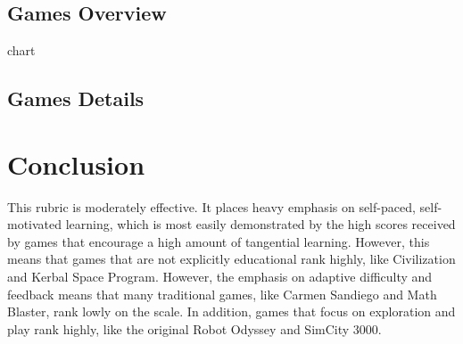 \documentclass[12pt]{report}
\begin{document}
		

	\subsection{Games Overview}
		chart
	\subsection{Games Details}
		

\section{Conclusion}
	This rubric is moderately effective. It places heavy emphasis on self-paced, self-motivated learning, which is most easily demonstrated by the high scores received by games that encourage a high amount of tangential learning. However, this means that games that are not explicitly educational rank highly, like Civilization and Kerbal Space Program. However, the emphasis on adaptive difficulty and feedback means that many traditional games, like Carmen Sandiego and Math Blaster, rank lowly on the scale. In addition, games that focus on exploration and play rank highly, like the original Robot Odyssey and SimCity 3000.
\end{document}
